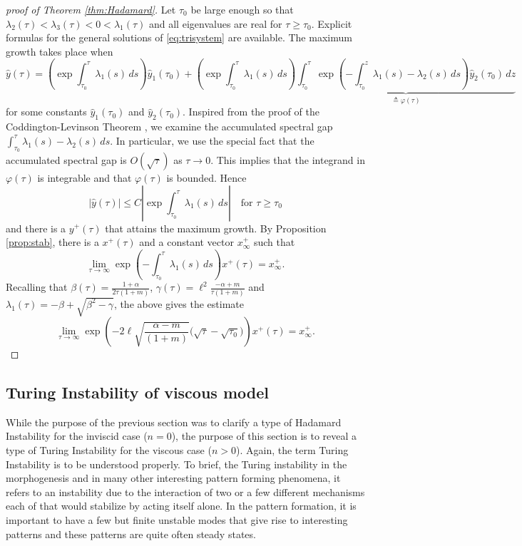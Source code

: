 \documentclass[a4paper,11pt]{article}
\def\l{{\ell}}
\theoremstyle{remark}
\begin{document}
{\begin{proof}[proof of Theorem \ref{thm:Hadamard}]
Let $\tau_0$ be large enough so that $\lambda_2(\tau) < \lambda_3(\tau) < 0 < \lambda_1(\tau)$ and all eigenvalues are real for $\tau\ge \tau_0$. Explicit formulas for the general solutions of \eqref{eq:trisystem} are available. The maximum growth  takes place when
$$ \hat{y}(\tau)=\left(\exp{\int_{\tau_0}^\tau \lambda_1(s)\, ds} \right)\hat y_1(\tau_0) +  \left(\exp{\int_{\tau_0}^\tau \lambda_1(s)\, ds}\right) \underbrace{\int_{\tau_0}^\tau \exp{\left(-\int_{\tau_0}^z \lambda_1(s)-\lambda_2(s)\,ds\right)}\hat y_2(\tau_0) \, dz}_{\triangleq \varphi(\tau)}$$
for some constants $\hat{y}_1(\tau_0)$ and $\hat{y}_2(\tau_0)$. Inspired from the proof of the Coddington-Levinson Theorem \cite{CL1955}, we examine the accumulated spectral gap $\int_{\tau_0}^\tau \lambda_1(s)-\lambda_2(s)\,ds$. In particular, we use the special fact that the accumulated spectral gap is ${O}(\sqrt{\tau})$ as $\tau \rightarrow 0$. This implies that the integrand in $\varphi(\tau)$ is integrable and that $\varphi(\tau)$ is bounded. Hence
$$|\hat{y}(\tau)|\le C \left| \exp{\int_{\tau_0}^\tau \lambda_1(s)\, ds}\right| \quad \text{for }\tau\ge\tau_0$$
and there is a $y^+(\tau)$ that attains the maximum growth. By Proposition \ref{prop:stab}, there is a $x^+(\tau)$ and a constant vector $x^+_\infty$ such that
\begin{equation*}
  \lim_{\tau \rightarrow \infty}\exp{\left(-\int_{\tau_0}^\tau \lambda_1(s)\, ds\right)} x^+(\tau) = x^+_\infty.
\end{equation*}
Recalling that $\beta(\tau) = \frac{1+\alpha}{2\tau(1+m)}$, $\gamma(\tau)= \l^2\frac{-\alpha+m}{\tau(1+m)}$ and $\lambda_1(\tau) = -\beta + \sqrt{\beta^2-\gamma}$, the above gives the estimate
\begin{equation}
  \lim_{\tau \rightarrow \infty}\exp{\left(-2\l\sqrt{\frac{\alpha-m}{(1+m)}}\big(\sqrt{\tau}-\sqrt{\tau_0}\big)\right)} x^+(\tau) = x^+_\infty.
\end{equation}
\end{proof}

\subsection{Turing Instability of viscous model}
While the purpose of the previous section was to clarify a type of Hadamard Instability for the inviscid case ($n=0$), the purpose of this section is to reveal a type of Turing Instability for the viscous case ($n>0$). Again, the term Turing Instability is to be understood properly. To brief, the Turing instability in the {morphogenesis} and in many other interesting pattern forming phenomena, it refers to an instability due to the interaction of two or a few different  mechanisms each of that would stabilize by acting itself alone. In the pattern formation, it is important to have a few but finite unstable modes that give rise to interesting patterns and these patterns are quite often steady states.

}
\end{document}
